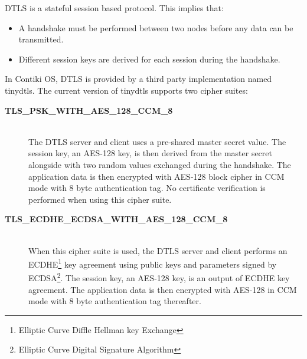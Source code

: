 DTLS is a stateful session based protocol. This implies that:
\begin{itemize}
\item A handshake must be performed between two nodes before any data can be transmitted.
\item Different session keys are derived for each session during the handshake.
\end{itemize}

In Contiki OS, DTLS is provided by a third party implementation named tinydtls\cite{tinydtls}. The current version of tinydtls supports two cipher suites:

\begin{description}
\item[\textbf{TLS\_PSK\_WITH\_AES\_128\_CCM\_8}] \hfill \\
The DTLS server and client uses a pre-shared master secret value. The session key, an AES-128 key, is then derived from the master secret alongside with two random values exchanged during the handshake. The application data is then encrypted with AES-128 block cipher in CCM mode with 8 byte authentication tag. No certificate verification is performed when using this cipher suite.
\item[\textbf{TLS\_ECDHE\_ECDSA\_WITH\_AES\_128\_CCM\_8}] \hfill \\
When this cipher suite is used, the DTLS server and client performs an ECDHE\footnote{Elliptic Curve Diffle Hellman key Exchange} key agreement using public keys and parameters signed by ECDSA\footnote{Elliptic Curve Digital Signature Algorithm}. The session key, an AES-128 key, is an output of ECDHE key agreement. The application data is then encrypted with AES-128 in CCM mode with 8 byte authentication tag thereafter.
\end{description}

